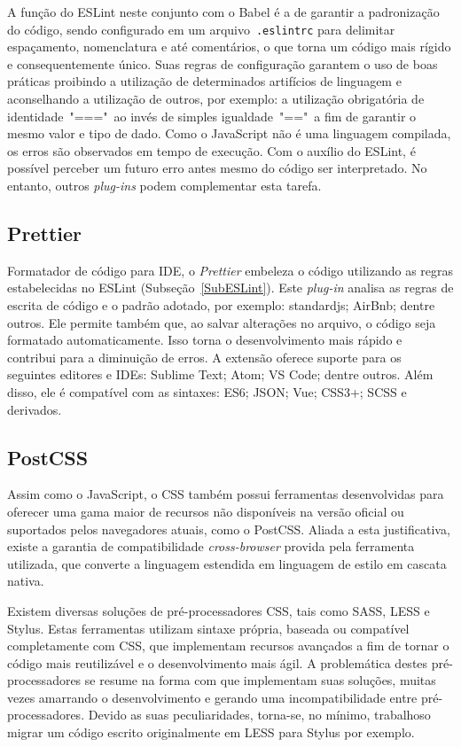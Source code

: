 A função do ESLint neste conjunto com o Babel é a de garantir a padronização do código, sendo configurado em um arquivo~\texttt{.eslintrc} para delimitar espaçamento, nomenclatura e até comentários, o que torna um código mais rígido e consequentemente único. Suas regras de configuração garantem o uso de boas práticas proibindo a utilização de determinados artifícios de linguagem e aconselhando a utilização de outros, por exemplo: a utilização obrigatória de identidade~"==="~ao invés de simples igualdade~"=="~a fim de garantir o mesmo valor e tipo de dado. Como o JavaScript não é uma linguagem compilada, os erros são observados em tempo de execução. Com o auxílio do ESLint, é possível perceber um futuro erro antes mesmo do código ser interpretado. No entanto, outros \textit{plug-ins} podem complementar esta tarefa.
%
%
%
\subsection{Prettier}
\label{SubPrettier}

Formatador de código para IDE, o \textit{Prettier} embeleza o código utilizando as regras estabelecidas no ESLint (Subseção~\ref{SubESLint}). Este \textit{plug-in} analisa as regras de escrita de código e o padrão adotado, por exemplo: standardjs; AirBnb; dentre outros. Ele permite também que, ao salvar alterações no arquivo, o código seja formatado automaticamente. Isso torna o desenvolvimento mais rápido e contribui para a diminuição de erros. A extensão oferece suporte para os seguintes editores e IDEs: Sublime Text; Atom; VS Code; dentre outros. Além disso, ele é compatível com as sintaxes: ES6; JSON; Vue; CSS3+; SCSS e derivados.
%
%
%
\subsection{PostCSS}
\label{SubPostCSS}

Assim como o JavaScript, o CSS também possui ferramentas desenvolvidas para oferecer uma gama maior de recursos não disponíveis na versão oficial ou suportados pelos navegadores atuais, como o PostCSS. Aliada a esta justificativa, existe a garantia de compatibilidade \textit{cross-browser} provida pela ferramenta utilizada, que converte a linguagem estendida em linguagem de estilo em cascata nativa.

Existem diversas soluções de pré-processadores CSS, tais como SASS, LESS e Stylus. Estas ferramentas utilizam sintaxe própria, baseada ou compatível completamente com CSS, que implementam recursos avançados a fim de tornar o código mais reutilizável e o desenvolvimento mais ágil. A problemática destes pré-processadores se resume na forma com que implementam suas soluções, muitas vezes amarrando o desenvolvimento e gerando uma incompatibilidade entre pré-processadores. Devido as suas peculiaridades, torna-se, no mínimo, trabalhoso migrar um código escrito originalmente em LESS para Stylus por exemplo. 


